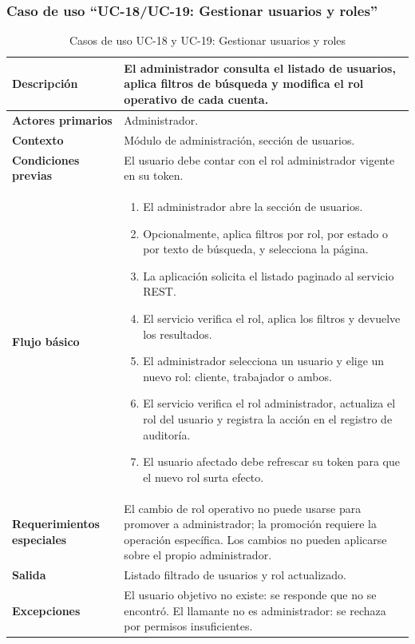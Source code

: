 \documentclass[doc,12pt,a4paper]{apa7}
\begin{document}
\subsubsection{Caso de uso ``UC-18/UC-19: Gestionar usuarios y roles''}

\begin{longtable}{|P{3.3cm}|L{11.2cm}|}
\caption{Casos de uso UC-18 y UC-19: Gestionar usuarios y roles}\\
\hline
\textbf{Descripción} & El administrador consulta el listado de usuarios, aplica filtros de búsqueda y modifica el rol operativo de cada cuenta. \\ \hline
\textbf{Actores primarios} & Administrador. \\ \hline
\textbf{Contexto} & Módulo de administración, sección de usuarios. \\ \hline
\textbf{Condiciones previas} & El usuario debe contar con el rol administrador vigente en su token. \\ \hline
\textbf{Flujo básico} &
\begin{enumerate}
    \item El administrador abre la sección de usuarios.
    \item Opcionalmente, aplica filtros por rol, por estado o por texto de búsqueda, y selecciona la página.
    \item La aplicación solicita el listado paginado al servicio REST.
    \item El servicio verifica el rol, aplica los filtros y devuelve los resultados.
    \item El administrador selecciona un usuario y elige un nuevo rol: cliente, trabajador o ambos.
    \item El servicio verifica el rol administrador, actualiza el rol del usuario y registra la acción en el registro de auditoría.
    \item El usuario afectado debe refrescar su token para que el nuevo rol surta efecto.
\end{enumerate} \\ \hline
\textbf{Requerimientos especiales} & El cambio de rol operativo no puede usarse para promover a administrador; la promoción requiere la operación específica. Los cambios no pueden aplicarse sobre el propio administrador. \\ \hline
\textbf{Salida} & Listado filtrado de usuarios y rol actualizado. \\ \hline
\textbf{Excepciones} & El usuario objetivo no existe: se responde que no se encontró. El llamante no es administrador: se rechaza por permisos insuficientes. \\ \hline
\end{longtable}
\end{document}
